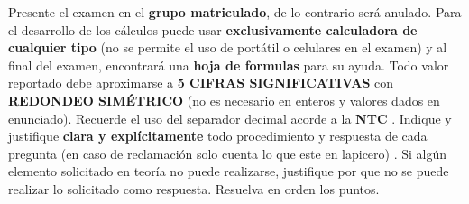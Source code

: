 \documentclass[12pt]{article}
\begin{document}
Presente el examen en el \textbf{grupo matriculado}, de lo contrario será anulado. %
Para el desarrollo de los cálculos puede usar \textbf{exclusivamente calculadora de cualquier tipo} (no se permite el uso de portátil o celulares en el examen) y %
al final del examen, encontrará una \textbf{hoja de formulas} para su ayuda. %
Todo valor reportado debe aproximarse a \textbf{5 CIFRAS SIGNIFICATIVAS} con \textbf{REDONDEO SIMÉTRICO} (no es necesario en enteros y valores dados en enunciado). Recuerde el uso del separador decimal acorde a la \textbf{NTC} %
.
\vspace{-5mm}
Indique y justifique \textbf{clara y explícitamente} todo procedimiento y respuesta de cada pregunta %
(en caso de reclamación solo cuenta lo que este en lapicero) %
. Si algún elemento solicitado en teoría no puede realizarse, justifique por que no se puede realizar lo solicitado como respuesta. %
Resuelva en orden los puntos. %
\vspace{-.5cm}
\end{document}
